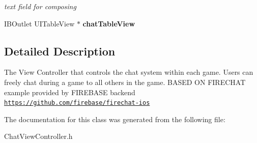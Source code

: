 \begin{DoxyCompactItemize}
\begin{DoxyCompactList}\small\item\em text field for composing \end{DoxyCompactList}\item 
\hypertarget{interface_chat_view_controller_a0be7a3452cd7b2fbee0348bdbe03762d}{I\+B\+Outlet U\+I\+Table\+View $\ast$ {\bfseries chat\+Table\+View}}\label{interface_chat_view_controller_a0be7a3452cd7b2fbee0348bdbe03762d}

\end{DoxyCompactItemize}


\subsection{Detailed Description}
The View Controller that controls the chat system within each game. Users can freely chat during a game to all others in the game. B\+A\+S\+E\+D O\+N F\+I\+R\+E\+C\+H\+A\+T example provided by F\+I\+R\+E\+B\+A\+S\+E backend \href{https://github.com/firebase/firechat-ios}{\tt https\+://github.\+com/firebase/firechat-\/ios} 

The documentation for this class was generated from the following file\+:\begin{DoxyCompactItemize}
\item 
Chat\+View\+Controller.\+h\end{DoxyCompactItemize}
